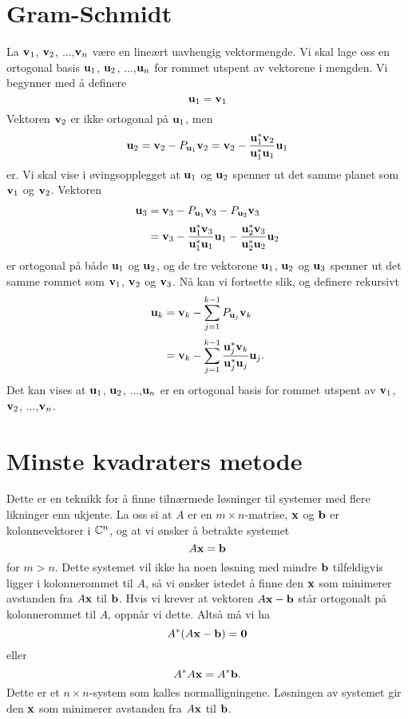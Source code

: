 \section*{Gram-Schmidt}
La $\mathbf{v}_1$, $\mathbf{v}_2$, ...,$\mathbf{v}_n$ være en lineært uavhengig vektormengde. 
Vi skal lage oss en ortogonal basis $\mathbf{u}_1$, $\mathbf{u}_2$, ...,$\mathbf{u}_n$ for rommet utspent av vektorene i mengden. 
Vi begynner med å definere
\[
\mathbf{u}_1=\mathbf{v}_1
\]
Vektoren $\mathbf{v}_2$ er ikke ortogonal på $\mathbf{u}_1$, men 
\[
\mathbf{u}_2=\mathbf{v}_2-P_{\mathbf{u}_1} \mathbf{v}_2=\mathbf{v}_2-\frac{ \mathbf{u}_1^*\mathbf{v}_2}{\mathbf{u}_1^* \mathbf{u}_1}\mathbf{u}_1
\]
er. 
Vi skal vise i øvingsopplegget at   $\mathbf{u}_1$ og $\mathbf{u}_2$ spenner ut det samme planet som $\mathbf{v}_1$ og $\mathbf{v}_2$.
Vektoren 
\begin{align*}
\mathbf{u}_3&=\mathbf{v}_3-P_{\mathbf{u}_1} \mathbf{v}_3-P_{\mathbf{u}_2} \mathbf{v}_3\\[2pt]&=\mathbf{v}_3-\frac{ \mathbf{u}_1^*\mathbf{v}_3}{\mathbf{u}_1^* \mathbf{u}_1}\mathbf{u}_1-\frac{ \mathbf{u}_2^*\mathbf{v}_3}{\mathbf{u}_2^* \mathbf{u}_2}\mathbf{u}_2
\end{align*}
er ortogonal på både $\mathbf{u}_1$ og $\mathbf{u}_2$, 
og de tre vektorene $\mathbf{u}_1$, $\mathbf{u}_2$ og $\mathbf{u}_3$  
spenner ut det samme rommet som $\mathbf{v}_1$, $\mathbf{v}_2$ og $\mathbf{v}_3$. 
Nå kan vi fortsette slik, og definere rekursivt
\begin{align*}
\mathbf{u}_k&=\mathbf{v}_k-\sum_{j=1}^{k-1}P_{\mathbf{u}_j} \mathbf{v}_k\\[2pt]&=\mathbf{v}_k-\sum_{j=1}^{k-1}\frac{ \mathbf{u}_j^*\mathbf{v}_k}{\mathbf{u}_j^* \mathbf{u}_j}\mathbf{u}_j.
\end{align*}
Det kan vises at $\mathbf{u}_1$, $\mathbf{u}_2$, ...,$\mathbf{u}_n$ er en ortogonal basis for rommet utspent av $\mathbf{v}_1$, $\mathbf{v}_2$, ...,$\mathbf{v}_n$.





\section*{Minste kvadraters metode}
Dette er en teknikk for å finne tilnærmede løsninger til systemer med flere likninger enn ukjente. 
La oss si at $A$ er en $m \times n$-matrise, $\mathbf{x}$ og $\mathbf{b}$ er kolonnevektorer i $\mathbb{C}^n$, og at vi ønsker å betrakte systemet
\[
A\mathbf{x}=\mathbf{b}
\]
for $m>n$. Dette systemet vil ikke ha noen løsning med mindre $\mathbf{b}$ tilfeldigvis ligger i kolonnerommet til $A$, 
så vi ønsker istedet å finne den $\mathbf{x}$ som minimerer avstanden fra $A\mathbf{x}$ til $\mathbf{b}$. 
Hvis vi krever at vektoren $A\mathbf{x}-\mathbf{b}$ står ortogonalt på kolonnerommet til $A$, oppnår vi dette. Altså må vi ha
\[
A^*(A\mathbf{x}-\mathbf{b})=\mathbf{0}
\]
eller 
\[
A^*A\mathbf{x}=A^*\mathbf{b}.
\]
Dette er et $n \times n$-system som kalles normalligningene. Løsningen av systemet gir den $\mathbf{x}$ som minimerer avstanden fra $A\mathbf{x}$ til $\mathbf{b}$.

\kapittelslutt
